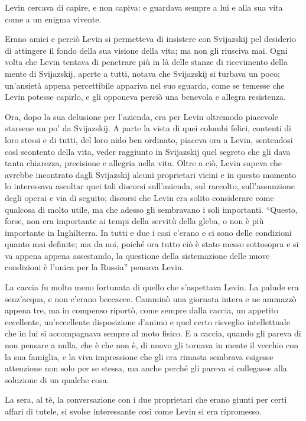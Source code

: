 Levin cercava di capire, e non capiva: e guardava sempre a lui e alla sua vita come a un enigma vivente. 

Erano amici e perciò Levin si permetteva di insistere con Svijazskij pel desiderio di attingere il fondo della sua visione della vita; ma non gli riusciva mai. Ogni volta che Levin tentava di penetrare più in là delle stanze di ricevimento della mente di Svijazskij, aperte a tutti, notava che Svijazskij si turbava un poco; un'ansietà appena percettibile appariva nel suo sguardo, come se temesse che Levin potesse capirlo, e gli opponeva perciò una benevola e allegra resistenza. 

Ora, dopo la sua delusione per l'azienda, era per Levin oltremodo piacevole starsene un po' da Svijazskij. A parte la vista di quei colombi felici, contenti di loro stessi e di tutti, del loro nido ben ordinato, piaceva ora a Levin, sentendosi così scontento della vita, veder raggiunto in Svijazskij quel segreto che gli dava tanta chiarezza, precisione e allegria nella vita. Oltre a ciò, Levin sapeva che avrebbe incontrato dagli Svijazskij alcuni proprietari vicini e in questo momento lo interessava ascoltar quei tali discorsi sull'azienda, sul raccolto, sull'assunzione degli operai e via di seguito; discorsi che Levin era solito considerare come qualcosa di molto utile, ma che adesso gli sembravano i soli importanti. ``Questo, forse, non era importante ai tempi della servitù della gleba, o non è più importante in Inghilterra. In tutti e due i casi c'erano e ci sono delle condizioni quanto mai definite; ma da noi, poiché ora tutto ciò è stato messo sottosopra e si va appena appena assestando, la questione della sistemazione delle nuove condizioni è l'unica per la Russia'' pensava Levin. 

La caccia fu molto meno fortunata di quello che s'aspettava Levin. La palude era senz'acqua, e non c'erano beccacce. Camminò una giornata intera e ne ammazzò appena tre, ma in compenso riportò, come sempre dalla caccia, un appetito eccellente, un'eccellente disposizione d'animo e quel certo risveglio intellettuale che in lui si accompagnava sempre al moto fisico. E a caccia, quando gli pareva di non pensare a nulla, che è che non è, di nuovo gli tornava in mente il vecchio con la sua famiglia, e la viva impressione che gli era rimasta sembrava esigesse attenzione non solo per se stessa, ma anche perché gli pareva si collegasse alla soluzione di un qualche cosa. 
\enlargethispage{\baselineskip}

La sera, al tè, la conversazione con i due proprietari che erano giunti per certi affari di tutele, si svolse interessante così come Levin si era ripromesso. 

